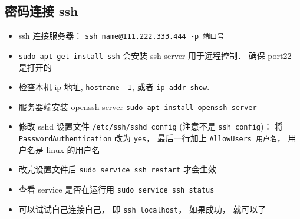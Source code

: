 
\begin{issues}
\issueDraft
\end{issues}

\subsection{密码连接 ssh}
\begin{itemize}
\item ssh 连接服务器： \verb|ssh name@111.222.333.444 -p 端口号|
\item \verb`sudo apt-get install ssh` 会安装 ssh server 用于远程控制． 确保 port22 是打开的
\item 检查本机 ip 地址, \verb`hostname -I`, 或者 \verb`ip addr show`.
\item 服务器端安装 openssh-server \verb`sudo apt install openssh-server`
\item 修改 sshd 设置文件 \verb`/etc/ssh/sshd_config` (注意不是 \verb`ssh_config`)： 将 \verb`PasswordAuthentication` 改为 \verb`yes`， 最后一行加上 \verb`AllowUsers 用户名`， 用户名是 linux 的用户名
\item 改完设置文件后 \verb`sudo service ssh restart` 才会生效
\item 查看 service 是否在运行用  \verb`sudo service ssh status`
\item 可以试试自己连接自己， 即 \verb`ssh localhost`， 如果成功， 就可以了
\end{itemize}

